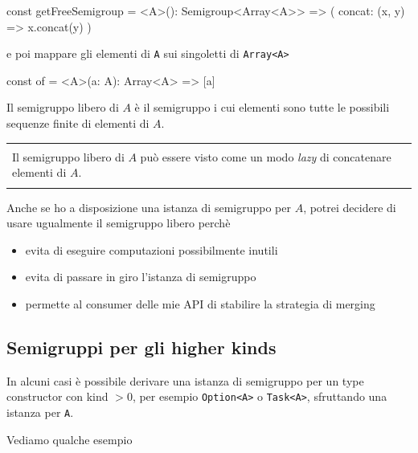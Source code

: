 \documentclass[12pt]{article}
\theoremstyle{definition}
\newenvironment{demo}
    {\begin{center}
    \begin{tabular}{|p{0.9\textwidth}|}
    \hline\\
    }
    {
    \\\\\hline
    \end{tabular}
    \end{center}
    }
\newenvironment{code}
  {\vspace{0.5cm} \VerbatimEnvironment\begin{typescriptcode}}
  {\end{typescriptcode} \vspace{0.2cm}}
\begin{document}
\begin{code}
const getFreeSemigroup = <A>(): Semigroup<Array<A>> => ({
  concat: (x, y) => x.concat(y)
})
\end{code}

e poi mappare gli elementi di \texttt{A} sui singoletti di \texttt{Array<A>}

\begin{code}
const of = <A>(a: A): Array<A> => [a]
\end{code}

Il semigruppo libero di $A$ è il semigruppo i cui elementi sono tutte le possibili sequenze finite di elementi di $A$.

\begin{demo}
Il semigruppo libero di $A$ può essere visto come un modo \emph{lazy} di concatenare elementi di $A$.
\end{demo}

Anche se ho a disposizione una istanza di semigruppo per $A$, potrei decidere di usare ugualmente il semigruppo libero perchè

\begin{itemize}
  \item evita di eseguire computazioni possibilmente inutili
  \item evita di passare in giro l'istanza di semigruppo
  \item permette al consumer delle mie API di stabilire la strategia di merging
\end{itemize}

\subsection{Semigruppi per gli higher kinds}

In alcuni casi è possibile derivare una istanza di semigruppo per un type constructor con kind $> 0$, per esempio \texttt{Option<A>} o \texttt{Task<A>},
sfruttando una istanza per \texttt{A}.

Vediamo qualche esempio
\end{document}
